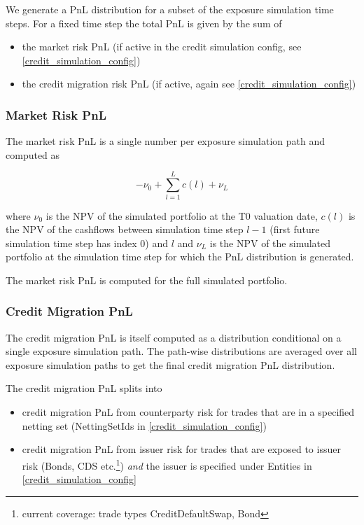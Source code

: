 \documentclass[12pt, a4paper]{article}
\begin{document}
We generate a PnL distribution for a subset of the exposure simulation time steps. For a fixed time step the
total PnL is given by the sum of

\begin{itemize}
\item the market risk PnL (if active in the credit simulation config, see \ref{credit_simulation_config})
\item the credit migration risk PnL (if active, again see \ref{credit_simulation_config})
\end{itemize}

\subsubsection{Market Risk PnL}

The market risk PnL is a single number per exposure simulation path and computed as

\begin{equation}
-\nu_0 + \sum_{l=1}^L c(l) + \nu_L
\end{equation}

where $\nu_0$ is the NPV of the simulated portfolio at the T0 valuation date, $c(l)$ is the NPV of the cashflows between
simulation time step $l-1$ (first future simulation time step has index 0) and $l$ and $\nu_L$ is the NPV of the
simulated portfolio at the simulation time step for which the PnL distribution is generated.

The market risk PnL is computed for the full simulated portfolio.

\subsubsection{Credit Migration PnL}

The credit migration PnL is itself computed as a distribution conditional on a single exposure simulation path. The path-wise distributions are averaged over all exposure simulation paths to get the final credit migration PnL distribution.

The credit migration PnL splits into

\begin{itemize}
\item credit migration PnL from counterparty risk for trades that are in a specified netting set (NettingSetIds in \ref{credit_simulation_config})
\item credit migration PnL from issuer risk for trades that are exposed to issuer risk (Bonds, CDS etc.\footnote{current
coverage: trade types CreditDefaultSwap, Bond}) {\em and} the issuer is specified under Entities in
  \ref{credit_simulation_config}
\end{itemize}
\end{document}
